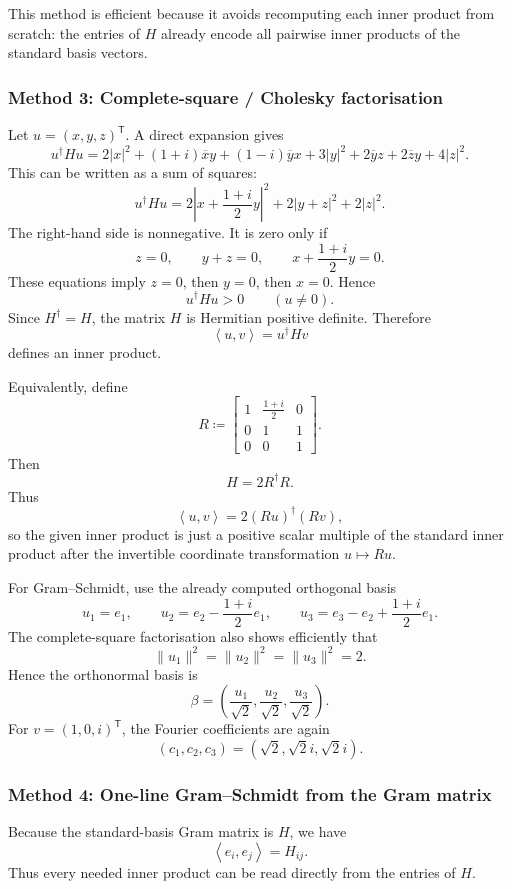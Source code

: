 \documentclass[12pt]{article}
\newcommand{\df}{\coloneqq}
\newcommand{\ip}[2]{\left\langle #1,#2\right\rangle}
\begin{document}
This method is efficient because it avoids recomputing each inner product from scratch: the entries of $H$ already encode all pairwise inner products of the standard basis vectors.



\subsubsection{Method 3: Complete-square / Cholesky factorisation}
Let $u=(x,y,z)^{\mathsf T}$. A direct expansion gives
\[
u^{\dagger}Hu
=2|x|^2+(1+i)\overline{x}y+(1-i)\overline{y}x+3|y|^2+2\overline{y}z+2\overline{z}y+4|z|^2.
\]
This can be written as a sum of squares:
\[
\boxed{\,
u^{\dagger}Hu
=2\left|x+\frac{1+i}{2}y\right|^2+2|y+z|^2+2|z|^2.
\,}
\]
The right-hand side is nonnegative. It is zero only if
\[
z=0,
\qquad
y+z=0,
\qquad
x+\frac{1+i}{2}y=0.
\]
These equations imply $z=0$, then $y=0$, then $x=0$. Hence
\[
u^{\dagger}Hu>0\qquad(u\ne0).
\]
Since $H^{\dagger}=H$, the matrix $H$ is Hermitian positive definite. Therefore
\[
\ip{u}{v}=u^{\dagger}Hv
\]
defines an inner product.

Equivalently, define
\[
R\df
\begin{bmatrix}
1&\frac{1+i}{2}&0\\
0&1&1\\
0&0&1
\end{bmatrix}.
\]
Then
\[
H=2R^{\dagger}R.
\]
Thus
\[
\ip{u}{v}=2(Ru)^{\dagger}(Rv),
\]
so the given inner product is just a positive scalar multiple of the standard inner product after the invertible coordinate transformation $u\mapsto Ru$.

For Gram--Schmidt, use the already computed orthogonal basis
\[
u_1=e_1,
\qquad
u_2=e_2-\frac{1+i}{2}e_1,
\qquad
u_3=e_3-e_2+\frac{1+i}{2}e_1.
\]
The complete-square factorisation also shows efficiently that
\[
\|u_1\|^2=\|u_2\|^2=\|u_3\|^2=2.
\]
Hence the orthonormal basis is
\[
\boxed{\,
\beta=\left(\frac{u_1}{\sqrt2},\frac{u_2}{\sqrt2},\frac{u_3}{\sqrt2}\right).
\,}
\]
For $v=(1,0,i)^{\mathsf T}$, the Fourier coefficients are again
\[
\boxed{\,(c_1,c_2,c_3)=(\sqrt2,\sqrt2 i,\sqrt2 i).\,}
\]

\subsubsection{Method 4: One-line Gram--Schmidt from the Gram matrix}
Because the standard-basis Gram matrix is $H$, we have
\[
\ip{e_i}{e_j}=H_{ij}.
\]
Thus every needed inner product can be read directly from the entries of $H$.
\end{document}
